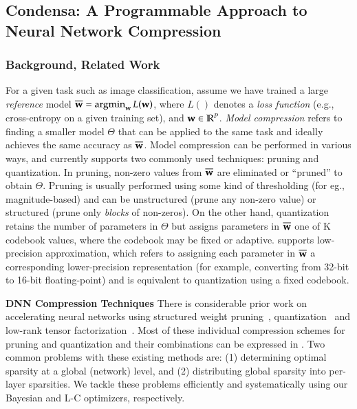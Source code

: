 \subsection{Condensa: A Programmable Approach to Neural Network Compression}
\subsubsection{Background, Related Work}

For a given task such as image classification, assume we have trained a large {\em reference} model $\overline{\bw} = \argmin_{\bw} L(\bw)$, where $L()$ denotes a {\em loss function} (e.g., cross-entropy on a given training set), and ${\bf w} \in \mathbb{R}^P$. {\em Model compression} refers to finding a smaller model $\Theta$ that can be applied to the same task and ideally achieves the same accuracy as $\overline{{\bf w}}$.
Model compression can be performed in various ways, and \algoName currently supports two commonly used techniques: pruning and quantization. In pruning, non-zero values from $\overline{{\bf w}}$ are eliminated or ``pruned'' to obtain $\Theta$. Pruning is usually performed using some kind of thresholding (for eg., magnitude-based) and can be unstructured (prune any non-zero value) or structured (prune only {\em blocks} of non-zeros). On the other hand, quantization retains the number of parameters in $\Theta$ but assigns parameters in $\overline{{\bf w}}$ one of K codebook values, where the codebook may be fixed or adaptive. \algoName supports low-precision approximation, which refers to assigning each parameter in $\overline{{\bf w}}$ a corresponding lower-precision representation (for example, converting from 32-bit to 16-bit floating-point) and is equivalent to quantization using a fixed codebook.


\noindent \textbf{DNN Compression Techniques}
There is considerable prior work on accelerating neural networks using structured 
weight pruning~\cite{wang2019structured,mccarley2020structured,frankle2018lottery, han2015learning, luo2017thinet, han2017ese, dong2017more, han2016eie, polyak2015channel, hu2016network, anwar2016compact, molchanov2016pruning}, quantization~\cite{zhu2016trained, gong2014compressing} and 
low-rank tensor factorization~\cite{kossaifi2020factorized,lebedev2014speeding, xue2013restructuring, denton2014exploiting, girshick2015fast}.
Most of these individual compression
schemes for pruning and quantization and their combinations can be expressed in \algoName. Two common problems with these existing methods are: (1) determining optimal sparsity at a global (network) level, and (2) distributing global sparsity into per-layer sparsities.
We tackle these problems efficiently and systematically using our Bayesian and L-C optimizers, respectively.


